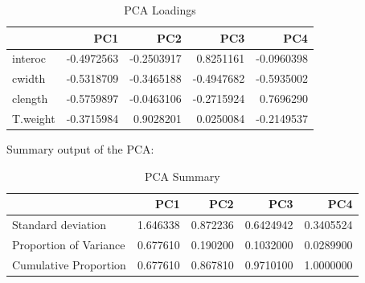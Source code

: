 \documentclass[]{article}
\newenvironment{Shaded}{\begin{snugshade}}{\end{snugshade}}
\newcommand{\DataTypeTok}[1]{\textcolor[rgb]{0.13,0.29,0.53}{#1}}
\newcommand{\KeywordTok}[1]{\textcolor[rgb]{0.13,0.29,0.53}{\textbf{#1}}}
\newcommand{\NormalTok}[1]{#1}
\newcommand{\OperatorTok}[1]{\textcolor[rgb]{0.81,0.36,0.00}{\textbf{#1}}}
\newcommand{\StringTok}[1]{\textcolor[rgb]{0.31,0.60,0.02}{#1}}
\begin{document}
\begin{table}[t]

\caption{\label{tab:unnamed-chunk-13}PCA Loadings}
\centering
\begin{tabular}{l|r|r|r|r}
\hline
  & PC1 & PC2 & PC3 & PC4\\
\hline
interoc & -0.4972563 & -0.2503917 & 0.8251161 & -0.0960398\\
\hline
cwidth & -0.5318709 & -0.3465188 & -0.4947682 & -0.5935002\\
\hline
clength & -0.5759897 & -0.0463106 & -0.2715924 & 0.7696290\\
\hline
T.weight & -0.3715984 & 0.9028201 & 0.0250084 & -0.2149537\\
\hline
\end{tabular}
\end{table}

Summary output of the PCA:

\begin{Shaded}
\end{Shaded}

\begin{table}[t]

\caption{\label{tab:unnamed-chunk-14}PCA Summary}
\centering
\begin{tabular}{l|r|r|r|r}
\hline
  & PC1 & PC2 & PC3 & PC4\\
\hline
Standard deviation & 1.646338 & 0.872236 & 0.6424942 & 0.3405524\\
\hline
Proportion of Variance & 0.677610 & 0.190200 & 0.1032000 & 0.0289900\\
\hline
Cumulative Proportion & 0.677610 & 0.867810 & 0.9710100 & 1.0000000\\
\hline
\end{tabular}
\end{table}
\end{document}
